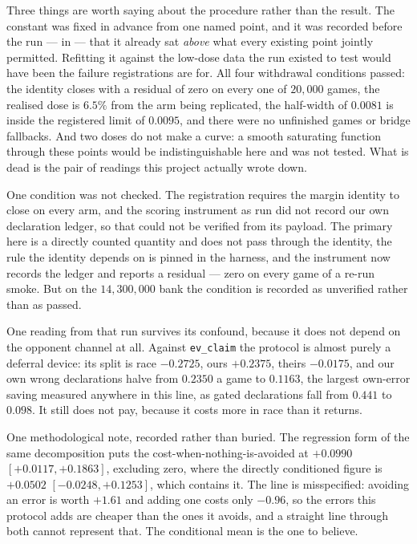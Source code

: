 \documentclass[11pt,letterpaper]{article}
\begin{document}
Three things are worth saying about the procedure rather than the result. The
constant was fixed in advance from one named point, and it was recorded before
the run --- in  --- that it already
sat \emph{above} what every existing point jointly permitted. Refitting it
against the low-dose data the run existed to test would have been the failure
registrations are for. All four withdrawal conditions passed: the identity
closes with a residual of zero on every one of $20{,}000$ games, the realised
dose is $6.5\%$ from the arm being replicated, the half-width of $0.0081$ is
inside the registered limit of $0.0095$, and there were no unfinished games or
bridge fallbacks. And two doses do not make a curve: a smooth saturating
function through these points would be indistinguishable here and was not
tested. What is dead is the pair of readings this project actually wrote down.

One condition was not checked. The registration requires the margin identity to
close on every arm, and the scoring instrument as run did not record our own
declaration ledger, so that could not be verified from its payload. The
primary here is a directly counted quantity and does not pass through the
identity, the rule the identity depends on is pinned in the harness, and the
instrument now records the ledger and reports a residual --- zero on every game
of a re-run smoke. But on the $14{,}300{,}000$ bank the condition is recorded as
unverified rather than as passed.

One reading from that run survives its confound, because it does not depend on
the opponent channel at all. Against \texttt{ev\_claim} the protocol is almost
purely a deferral device: its split is race $-0.2725$, ours $+0.2375$, theirs
$-0.0175$, and our own wrong declarations halve from $0.2350$ a game to
$0.1163$, the largest own-error saving measured anywhere in this line, as gated
declarations fall from $0.441$ to $0.098$. It still does not pay, because it
costs more in race than it returns.

One methodological note, recorded rather than buried. The regression form of
the same decomposition puts the cost-when-nothing-is-avoided at $+0.0990$
$[+0.0117, +0.1863]$, excluding zero, where the directly conditioned figure is
$+0.0502$ $[-0.0248, +0.1253]$, which contains it. The line is misspecified:
avoiding an error is worth $+1.61$ and adding one costs only $-0.96$, so the
errors this protocol adds are cheaper than the ones it avoids, and a straight
line through both cannot represent that. The conditional mean is the one to
believe.
\end{document}
